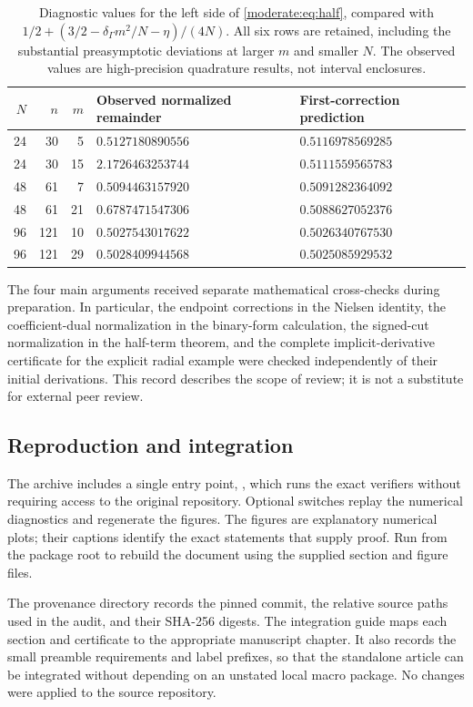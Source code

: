\begin{table}[tbp]
\centering
\small
\begin{tabular}{@{}rrrll@{}}
\toprule
$N$ & $n$ & $m$ & Observed normalized remainder
& First-correction prediction\\
\midrule
24 & 30 & 5  & $0.5127180890556$ & $0.5116978569285$\\
24 & 30 & 15 & $2.1726463253744$ & $0.5111559565783$\\
48 & 61 & 7  & $0.5094463157920$ & $0.5091282364092$\\
48 & 61 & 21 & $0.6787471547306$ & $0.5088627052376$\\
96 & 121 & 10 & $0.5027543017622$ & $0.5026340767530$\\
96 & 121 & 29 & $0.5028409944568$ & $0.5025085929532$\\
\bottomrule
\end{tabular}
\caption{Diagnostic values for the left side of
\eqref{moderate:eq:half}, compared with
$1/2+(3/2-\delta_\Gamma m^2/N-\eta)/(4N)$.
All six rows are retained, including the substantial
preasymptotic deviations at larger $m$ and smaller $N$.
The observed values are high-precision quadrature
results, not interval enclosures.}
\label{tab:half-diagnostics}
\end{table}

The four main arguments received separate mathematical
cross-checks during preparation. In particular, the endpoint
corrections in the Nielsen identity, the coefficient-dual
normalization in the binary-form calculation, the signed-cut
normalization in the half-term theorem, and the complete
implicit-derivative certificate for the explicit radial example
were checked independently of their initial derivations.
This record describes the scope of review; it is not a
substitute for external peer review.

\subsection{Reproduction and integration}

The archive includes a single entry point,
, which runs the exact verifiers without
requiring access to the original repository. Optional switches
replay the numerical diagnostics and regenerate the figures.
The figures are explanatory numerical plots; their captions
identify the exact statements that supply proof.
Run  from the package root to
rebuild the document using the supplied section and figure files.

The provenance directory records the pinned commit, the
relative source paths used in the audit, and their SHA-256
digests. The integration guide maps each section and certificate
to the appropriate manuscript chapter. It also records the
small preamble requirements and label prefixes, so that the
standalone article can be integrated without depending on an
unstated local macro package. No changes were applied to the
source repository.
